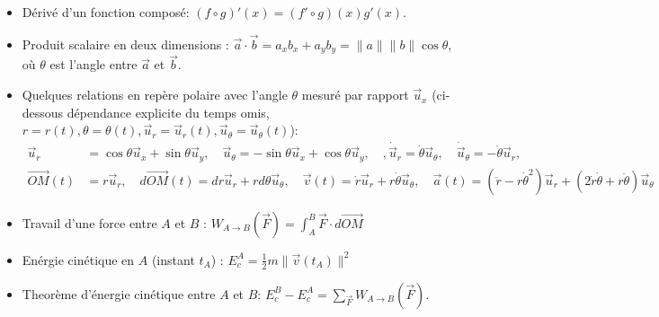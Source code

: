 \documentclass[french,10pt]{article}
\begin{document}
	\begin{itemize}
		\item Dérivé d'un fonction composé: $(f \circ g)'(x) = (f' \circ g)(x) g'(x)$.
		\item Produit scalaire en deux dimensions : $\vec{a} \cdot \vec{b} = a_x b_x + a_y b_y = \|a\| \|b\| \cos{\theta}$, où $\theta$ est l'angle entre $\vec{a}$ et $\vec{b}$.
		\item Quelques relations en repère polaire avec l'angle $\theta$ mesuré par rapport $\Vec{u}_x$ (ci-dessous dépendance explicite du temps omis, $r=r(t) , \theta=\theta(t), \Vec{u}_r = \Vec{u}_r(t), \Vec{u}_{\theta} = \Vec{u}_{\theta}(t)$):
		\begin{align*}
			\Vec{u}_r &= \cos{\theta} \Vec{u}_x + \sin{\theta} \Vec{u}_y, \quad \Vec{u}_{\theta} = -\sin{\theta} \Vec{u}_x + \cos{\theta} \Vec{u}_y, \quad, 
			\dot{\Vec{u}}_r = \dot{\theta} \Vec{u}_{\theta}, \quad  \dot{\Vec{u}}_{\theta} = -\dot{\theta} \Vec{u}_{r}, \\
			\vec{OM}(t) &= r \vec{u}_r, \quad  d\vec{OM}(t) = d r \vec{u}_r + r d\theta \vec{u}_{\theta}, \quad
			\Vec{v}(t) = \dot{r} \Vec{u}_r + r \dot{\theta} \Vec{u}_{\theta}, \quad
			\Vec{a}(t) = (\ddot{r} - r\dot{\theta}^2) \Vec{u}_r + (2 \dot{r} \dot{\theta} + r \ddot{\theta}) \Vec{u}_{\theta}
		\end{align*}
		\item Travail d'une force entre $A$ et $B$ : $\displaystyle W_{A \to B}(\vec{F}) = \int_A^B \vec{F} \cdot d\vec{OM} $
		\item Enérgie cinétique en $A$ (instant $t_A$) : $E^A_c = \frac{1}{2} m \|\vec{v}(t_A)\|^2$ 
		\item Theorème d'énergie cinétique entre $A$ et $B$: $E_c^B - E_c^A = \sum_{\Vec{F}}  \displaystyle W_{A \to B}(\vec{F})$. 
	\end{itemize}
	
\end{document}
